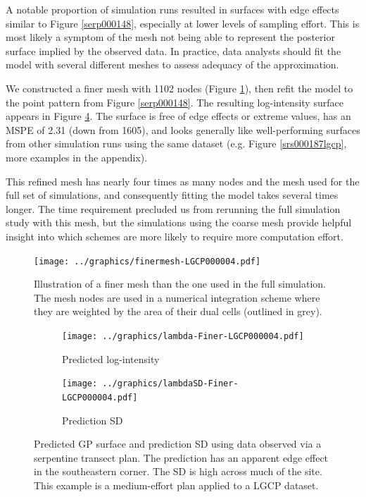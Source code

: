\documentclass[review]{elsarticle}
\begin{document}
A notable proportion of simulation runs resulted in surfaces with edge effects
similar to Figure \ref{serp000148}, especially at lower levels of sampling
effort. This is most likely a symptom of the mesh not being able to represent
the posterior surface implied by the observed data. In practice, data analysts
should fit the model with several different meshes to assess adequacy of the
approximation.

We constructed a finer mesh with 1102 nodes (Figure \ref{meshfiner}), then
refit the model to the point pattern from Figure \ref{serp000148}. The
resulting log-intensity surface appears in Figure \ref{finer}. The surface is
free of edge effects or extreme values, has an MSPE of 2.31 (down from 1605),
and looks generally like well-performing surfaces from other simulation runs
using the same dataset (e.g. Figure \ref{srs000187lgcp}, more examples in the
appendix).

This refined mesh has nearly four times as many nodes and the mesh used for
the full set of simulations, and consequently fitting the model takes several
times longer. The time requirement precluded us from rerunning the full
simulation study with this mesh, but the simulations using the coarse mesh
provide helpful insight into which schemes are more likely to require more
computation effort.

\begin{figure}
\texttt{[image: ../graphics/finermesh-LGCP000004.pdf]}
\caption{Illustration of a finer mesh than the one used in the full simulation.
The mesh nodes are used in a numerical integration scheme where they are
weighted by the area of their dual cells (outlined in grey).}
\label{meshfiner}
\end{figure}

\begin{figure}

\begin{subfigure}{5in}
\texttt{[image: ../graphics/lambda-Finer-LGCP000004.pdf]}
\caption{Predicted log-intensity}
\label{lambdafinerlgcp}
\end{subfigure}

\begin{subfigure}{5in}
\texttt{[image: ../graphics/lambdaSD-Finer-LGCP000004.pdf]}
\caption{Prediction SD}
\label{sdfinerlgcp}
\end{subfigure}

\caption{Predicted GP surface and prediction SD using data observed via a
serpentine transect plan. The prediction has an apparent edge effect in the
southeastern corner. The SD is high across much of the site. This example is
a medium-effort plan applied to a LGCP dataset.}
\label{finer}
\end{figure}
\end{document}
